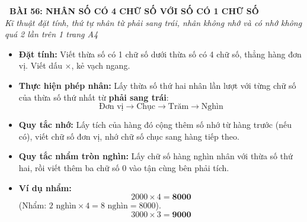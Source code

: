 \documentclass[11pt,a4paper]{article}
\begin{document}
\begin{tcolorbox}[
  enhanced,
  colback=white,
  colframe=primary,
  arc=3mm,
  boxrule=1.2pt,
  left=4mm, right=4mm, top=2.5mm, bottom=2.5mm,
  drop shadow=black!10!white
]
  \centering
  {\Large\bfseries\color{primary}\faBookmark\ BÀI 56: NHÂN SỐ CÓ 4 CHỮ SỐ VỚI SỐ CÓ 1 CHỮ SỐ}\\[1.5mm]
  {\small\itshape\color{black!75}Kĩ thuật đặt tính, thứ tự nhân từ phải sang trái, nhân không nhớ và có nhớ không quá 2 lần trên 1 trang A4}
\end{tcolorbox}

\vspace{-2mm}


\noindent
\begin{minipage}[t]{0.49\textwidth}\vspace{0pt}
\begin{tcolorbox}[
  enhanced,
  colback=blue!4!white,
  colframe=blue!75!black,
  arc=2mm, boxrule=0.8pt,
  left=2mm, right=2mm, top=1.8mm, bottom=1.8mm,
  title={\footnotesize\bfseries\color{white}\faTimes\ 1. Quy trình Đặt tính rồi tính}
]
{\footnotesize
\begin{itemize}\setlength{\itemsep}{1.5pt}\setlength{\leftskip}{-2.5mm}
  \item \textbf{Đặt tính:} Viết thừa số có 1 chữ số dưới thừa số có 4 chữ số, thẳng hàng đơn vị. Viết dấu $\times$, kẻ vạch ngang.
  \item \textbf{Thực hiện phép nhân:} Lấy thừa số thứ hai nhân lần lượt với từng chữ số của thừa số thứ nhất từ \textbf{phải sang trái}:
  $$\text{Đơn vị} \to \text{Chục} \to \text{Trăm} \to \text{Nghìn}$$
  \item \textbf{Quy tắc nhớ:} Lấy tích của hàng đó cộng thêm số nhớ từ hàng trước (nếu có), viết chữ số đơn vị, nhớ chữ số chục sang hàng tiếp theo.
\end{itemize}
}
\end{tcolorbox}
\end{minipage}
\hfill
\begin{minipage}[t]{0.49\textwidth}\vspace{0pt}
\begin{tcolorbox}[
  enhanced,
  colback=teal!4!white,
  colframe=teal!75!black,
  arc=2mm, boxrule=0.8pt,
  left=2mm, right=2mm, top=1.8mm, bottom=1.8mm,
  title={\footnotesize\bfseries\color{white}\faKey\ 2. Kĩ năng nhân nhẩm số tròn nghìn}
]
{\footnotesize
\begin{itemize}\setlength{\itemsep}{1.5pt}\setlength{\leftskip}{-2.5mm}
  \item \textbf{Quy tắc nhẩm tròn nghìn:}
  Lấy chữ số hàng nghìn nhân với thừa số thứ hai, rồi viết thêm ba chữ số $0$ vào tận cùng bên phải tích.
  \item \textbf{Ví dụ nhẩm:}
  $$2000 \times 4 = \mathbf{8000}$$
  (Nhẩm: $2\text{ nghìn} \times 4 = 8\text{ nghìn} = 8000$).
  $$3000 \times 3 = \mathbf{9000}$$
\end{itemize}
}
\end{tcolorbox}
\end{minipage}
\end{document}
